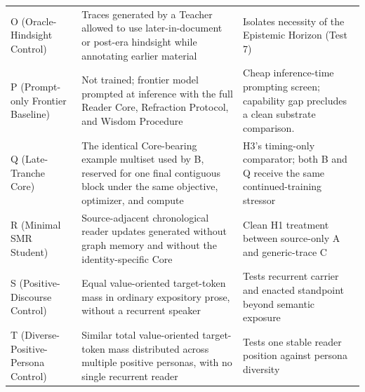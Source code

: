 \begin{longtable}{
  >{\raggedright\arraybackslash}p{3.1cm}
  >{\raggedright\arraybackslash}p{5.5cm}
  >{\raggedright\arraybackslash}p{6.4cm}}
        O (Oracle-Hindsight Control) & Traces generated by a Teacher allowed to use later-in-document or post-era hindsight while annotating earlier material & Isolates necessity of the Epistemic Horizon (Test 7) \\
        P (Prompt-only Frontier Baseline) & Not trained; frontier model prompted at inference with the full Reader Core, Refraction Protocol, and Wisdom Procedure & Cheap inference-time prompting screen; capability gap precludes a clean substrate comparison. \\
        Q (Late-Tranche Core) & The identical Core-bearing example multiset used by B, reserved for one final contiguous block under the same objective, optimizer, and compute & H3's timing-only comparator; both B and Q receive the same continued-training stressor \\
        R (Minimal SMR Student) & Source-adjacent chronological reader updates generated without graph memory and without the identity-specific Core & Clean H1 treatment between source-only A and generic-trace C \\
        S (Positive-Discourse Control) & Equal value-oriented target-token mass in ordinary expository prose, without a recurrent speaker & Tests recurrent carrier and enacted standpoint beyond semantic exposure \\
        T (Diverse-Positive-Persona Control) & Similar total value-oriented target-token mass distributed across multiple positive personas, with no single recurrent reader & Tests one stable reader position against persona diversity \\
\end{longtable}
\endgroup

